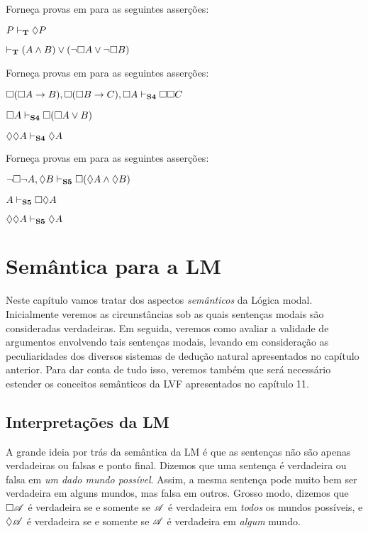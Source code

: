 \problempart
Forneça provas em  \mlT{} para as seguintes asserções:
\begin{earg}
	\item $P\vdash_{\mathbf{T}}\Diamond P$
	\item $\vdash_{\mathbf{T}} (A\wedge B)\vee(\neg \Box A\vee\neg\Box B)$
\end{earg}

\problempart
Forneça provas em  \mlSfour{}  para as seguintes asserções:
\begin{earg}
	\item $\Box(\Box A\rightarrow B), \Box (\Box B\rightarrow C), \Box A \vdash_{\mathbf{S4}} \Box\Box C$
	\item $\Box A \vdash_{\mathbf{S4}} \Box(\Box A \vee B)$
	\item $\Diamond \Diamond A \vdash_{\mathbf{S4}} \Diamond A$
\end{earg}


\problempart
Forneça provas em \mlSfive{} para as seguintes asserções:
\begin{earg}
	\item $\neg\Box\neg A, \Diamond B\vdash_{\mathbf{S5}} \Box(\Diamond A \wedge \Diamond B)$
	\item $A \vdash_{\mathbf{S5}}  \Box\Diamond A$
	\item $\Diamond\Diamond A\vdash_{\mathbf{S5}}  \Diamond A$
\end{earg}

\chapter{Semântica para  a  LM}
\label{Semantics}

Neste capítulo vamos tratar dos aspectos \emph{semânticos} da Lógica modal.  Inicialmente veremos as circunstâncias sob as quais sentenças modais são consideradas verdadeiras. Em seguida, veremos como avaliar a validade de argumentos envolvendo tais sentenças modais, levando em consideração as peculiaridades dos diversos sistemas  de  dedução natural  apresentados no capítulo anterior. Para dar conta de tudo isso, veremos também  que será necessário  estender os conceitos semânticos da LVF apresentados no capítulo 11. 

\section{Interpretações da LM}

A grande ideia por trás da semântica da LM é que as sentenças não são apenas verdadeiras ou falsas e ponto final.  Dizemos que uma  sentença é verdadeira ou falsa em \emph{um dado mundo possível}. Assim,  a mesma sentença pode muito bem ser verdadeira em alguns mundos,  mas falsa em outros. Grosso modo, dizemos que $\Box \mathscr{A}$ é verdadeira   se e somente se $\mathscr{A}$ é verdadeira em \emph{todos} os mundos possíveis, e $\Diamond\mathscr{A}$ é verdadeira se e somente se  $\mathscr{A}$ é verdadeira em \emph{algum} mundo.

